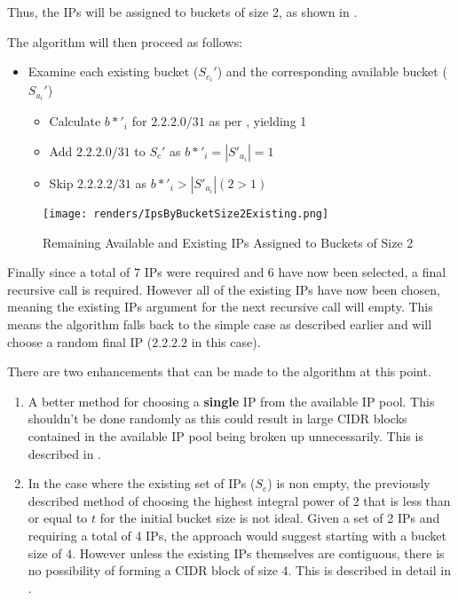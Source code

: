 Thus, the IPs will be assigned to buckets of size 2, as shown in .

The algorithm will then proceed as follows:
\begin{itemize}
\item{Examine each existing bucket ($S_{e_i}'$) and the corresponding available bucket ($S_{a_i}'$)}
\begin{itemize}
\item{Calculate $b*'_i$ for $2.2.2.0/31$ as per , yielding 1}
\item{Add $2.2.2.0/31$ to $S_c'$ as $b*'_i = |S'_{a_i}| = 1$} 
\item{Skip $2.2.2.2/31$ as $b*'_i > |S'_{a_i}| (2 > 1)$}
\end{itemize}
\end{itemize}

\begin{figure}[H]
      \centering
      \texttt{[image: renders/IpsByBucketSize2Existing.png]}
      \caption{Remaining Available and Existing IPs Assigned to Buckets of Size 2}
      \label{fig:ipsByBucketExisting2}
\end{figure}

Finally since a total of 7 IPs were required and 6 have now been selected, a final recursive call is required. However all of the existing IPs have now been chosen, meaning the existing IPs argument for the next recursive call will empty. This means the algorithm falls back to the simple case as described earlier and will choose a random final IP ($2.2.2.2$ in this case). 

There are two enhancements that can be made to the algorithm at this point.

\begin{enumerate}
\item{A better method for choosing a \textbf{single} IP from the available IP pool. This shouldn't be done randomly as this could result in large CIDR blocks contained in the available IP pool being broken up unnecessarily. This is described in .}
\item{In the case where the existing set of IPs ($S_e$) is non empty, the previously described method of choosing the highest integral power of 2 that is less than or equal to $t$ for the initial bucket size is not ideal. Given a set of 2 IPs and requiring a total of 4 IPs, the approach would suggest starting with a bucket size of 4. However unless the existing IPs themselves are contiguous, there is no possibility of forming a CIDR block of size 4. This is described in detail in .}
\end{enumerate}

